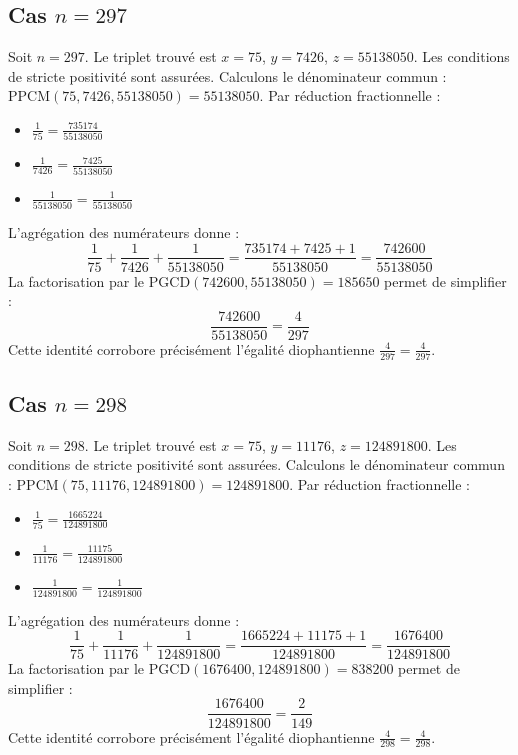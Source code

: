 \documentclass[11pt,a4paper]{article}
\begin{document}
\subsection{Cas $n = 297$}
Soit $n = 297$. Le triplet trouvé est $x = 75$, $y = 7426$, $z = 55138050$.
Les conditions de stricte positivité sont assurées.
Calculons le dénominateur commun : $\text{PPCM}(75, 7426, 55138050) = 55138050$.
Par réduction fractionnelle :
\begin{itemize}
    \item $\frac{1}{75} = \frac{735174}{55138050}$
    \item $\frac{1}{7426} = \frac{7425}{55138050}$
    \item $\frac{1}{55138050} = \frac{1}{55138050}$
\end{itemize}
L'agrégation des numérateurs donne :
$$ \frac{1}{75} + \frac{1}{7426} + \frac{1}{55138050} = \frac{735174 + 7425 + 1}{55138050} = \frac{742600}{55138050} $$
La factorisation par le $\text{PGCD}(742600, 55138050) = 185650$ permet de simplifier :
$$ \frac{742600}{55138050} = \frac{4}{297} $$
Cette identité corrobore précisément l'égalité diophantienne $\frac{4}{297} = \frac{4}{297}$.

\subsection{Cas $n = 298$}
Soit $n = 298$. Le triplet trouvé est $x = 75$, $y = 11176$, $z = 124891800$.
Les conditions de stricte positivité sont assurées.
Calculons le dénominateur commun : $\text{PPCM}(75, 11176, 124891800) = 124891800$.
Par réduction fractionnelle :
\begin{itemize}
    \item $\frac{1}{75} = \frac{1665224}{124891800}$
    \item $\frac{1}{11176} = \frac{11175}{124891800}$
    \item $\frac{1}{124891800} = \frac{1}{124891800}$
\end{itemize}
L'agrégation des numérateurs donne :
$$ \frac{1}{75} + \frac{1}{11176} + \frac{1}{124891800} = \frac{1665224 + 11175 + 1}{124891800} = \frac{1676400}{124891800} $$
La factorisation par le $\text{PGCD}(1676400, 124891800) = 838200$ permet de simplifier :
$$ \frac{1676400}{124891800} = \frac{2}{149} $$
Cette identité corrobore précisément l'égalité diophantienne $\frac{4}{298} = \frac{4}{298}$.
\end{document}

